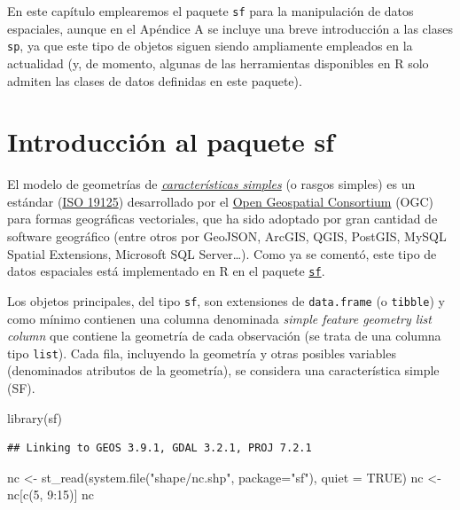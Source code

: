\documentclass[
  spanish,
]{book}
\newenvironment{Shaded}{\begin{snugshade}}{\end{snugshade}}
\newcommand{\AttributeTok}[1]{\textcolor[rgb]{0.77,0.63,0.00}{#1}}
\newcommand{\ConstantTok}[1]{\textcolor[rgb]{0.00,0.00,0.00}{#1}}
\newcommand{\DecValTok}[1]{\textcolor[rgb]{0.00,0.00,0.81}{#1}}
\newcommand{\FunctionTok}[1]{\textcolor[rgb]{0.00,0.00,0.00}{#1}}
\newcommand{\NormalTok}[1]{#1}
\newcommand{\OtherTok}[1]{\textcolor[rgb]{0.56,0.35,0.01}{#1}}
\newcommand{\SpecialCharTok}[1]{\textcolor[rgb]{0.00,0.00,0.00}{#1}}
\newcommand{\StringTok}[1]{\textcolor[rgb]{0.31,0.60,0.02}{#1}}
\theoremstyle{break}
\begin{document}
En este capítulo emplearemos el paquete \texttt{sf} para la manipulación de datos espaciales, aunque en el Apéndice A se incluye una breve introducción a las clases \texttt{sp}, ya que este tipo de objetos siguen siendo ampliamente empleados en la actualidad (y, de momento, algunas de las herramientas disponibles en R solo admiten las clases de datos definidas en este paquete).

\hypertarget{sf-intro}{%
\section{\texorpdfstring{Introducción al paquete \textbf{sf}}{Introducción al paquete sf}}\label{sf-intro}}

El modelo de geometrías de \emph{\href{https://en.wikipedia.org/wiki/Simple_Features}{características simples}} (o rasgos simples) es un estándar (\href{https://www.iso.org/standard/40114.html}{ISO 19125}) desarrollado por el \href{https://www.ogc.org}{Open Geospatial Consortium} (OGC) para formas geográficas vectoriales, que ha sido adoptado por gran cantidad de software geográfico (entre otros por GeoJSON, ArcGIS, QGIS, PostGIS, MySQL Spatial Extensions, Microsoft SQL Server\ldots).
Como ya se comentó, este tipo de datos espaciales está implementado en R en el paquete \href{https://r-spatial.github.io/sf}{\texttt{sf}}.

Los objetos principales, del tipo \texttt{sf}, son extensiones de \texttt{data.frame} (o \texttt{tibble}) y como mínimo contienen una columna denominada \emph{simple feature geometry list column} que contiene la geometría de cada observación (se trata de una columna tipo \texttt{list}).
Cada fila, incluyendo la geometría y otras posibles variables (denominados atributos de la geometría), se considera una característica simple (SF).

\begin{Shaded}
\begin{Highlighting}[]
\FunctionTok{library}\NormalTok{(sf)}
\end{Highlighting}
\end{Shaded}

\begin{verbatim}
## Linking to GEOS 3.9.1, GDAL 3.2.1, PROJ 7.2.1
\end{verbatim}

\begin{Shaded}
\begin{Highlighting}[]
\NormalTok{nc }\OtherTok{\textless{}{-}} \FunctionTok{st\_read}\NormalTok{(}\FunctionTok{system.file}\NormalTok{(}\StringTok{"shape/nc.shp"}\NormalTok{, }\AttributeTok{package=}\StringTok{"sf"}\NormalTok{), }\AttributeTok{quiet =} \ConstantTok{TRUE}\NormalTok{)}
\NormalTok{nc }\OtherTok{\textless{}{-}}\NormalTok{ nc[}\FunctionTok{c}\NormalTok{(}\DecValTok{5}\NormalTok{, }\DecValTok{9}\SpecialCharTok{:}\DecValTok{15}\NormalTok{)]}
\NormalTok{nc}
\end{Highlighting}
\end{Shaded}
\end{document}
